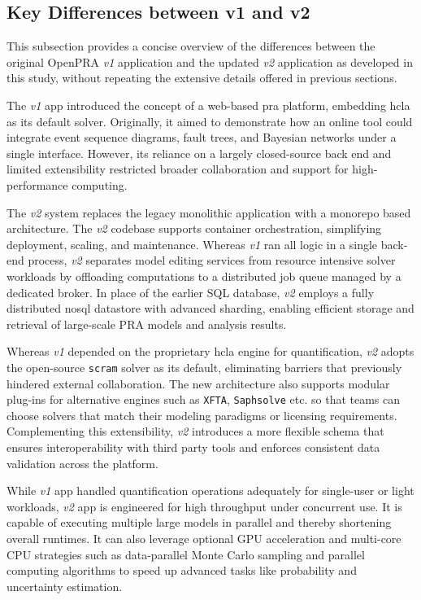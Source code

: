 \subsection{Key Differences between v1 and v2}
\label{sec:distinguish-v1-v2}
This subsection provides a concise overview of the differences between the original OpenPRA \textit{v1} application and the updated \textit{v2} application as developed in this study, without repeating the extensive details offered in previous sections.

The \textit{v1} app introduced the concept of a web-based \acrshort{pra} platform, embedding \acrshort{hcla} \cite{hcla_cmd} as its default solver. Originally, it aimed to demonstrate how an online tool could integrate event sequence diagrams, fault trees, and Bayesian networks under a single interface. However, its reliance on a largely closed-source back end and limited extensibility restricted broader collaboration and support for high-performance computing.

The \textit{v2} system replaces the legacy monolithic application with a monorepo based architecture. The \textit{v2} codebase supports container orchestration, simplifying deployment, scaling, and maintenance. Whereas \textit{v1} ran all logic in a single back-end process, \textit{v2} separates model editing services from resource intensive solver workloads by offloading computations to a distributed job queue managed by a dedicated broker. In place of the earlier SQL database, \textit{v2} employs a fully distributed \acrfull{nosql} datastore with advanced sharding, enabling efficient storage and retrieval of large-scale PRA models and analysis results.

Whereas \textit{v1} depended on the proprietary \acrshort{hcla} engine for quantification, \textit{v2} adopts the open-source \texttt{scram} solver as its default, eliminating barriers that previously hindered external collaboration. The new architecture also supports modular plug-ins for alternative engines such as \texttt{XFTA}, \texttt{Saphsolve} etc. so that teams can choose solvers that match their modeling paradigms or licensing requirements. Complementing this extensibility, \textit{v2} introduces a more flexible schema that ensures interoperability with third party tools and enforces consistent data validation across the platform.

While \textit{v1} app handled quantification operations adequately for single-user or light workloads, \textit{v2} app is engineered for high throughput under concurrent use. It is capable of executing multiple large models in parallel and thereby shortening overall runtimes. It can also leverage optional GPU acceleration and multi-core CPU strategies such as data-parallel Monte Carlo sampling and parallel computing algorithms to speed up advanced tasks like probability and uncertainty estimation.

